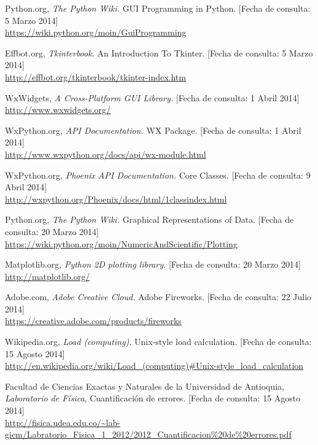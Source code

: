 \begin{thebibliography}{99}
	Python.org,
	\emph{The Python Wiki.}
	GUI Programming in Python. [Fecha de consulta: 5 Marzo 2014] \\
	\url{https://wiki.python.org/moin/GuiProgramming}
	
	Effbot.org,
	\emph{Tkinterbook.}
	An Introduction To Tkinter. [Fecha de consulta: 5 Marzo 2014] \\
	\url{http://effbot.org/tkinterbook/tkinter-index.htm}

	WxWidgets,
	\emph{A Cross-Platform GUI Library.} [Fecha de consulta: 1 Abril 2014] \\
	\url{http://www.wxwidgets.org/}

	WxPython.org,
	\emph{API Documentation.}
	WX Package. [Fecha de consulta: 1 Abril 2014] \\
	\url{http://www.wxpython.org/docs/api/wx-module.html}
	
	WxPython.org,
	\emph{Phoenix API Documentation.}
	Core Classes. [Fecha de consulta: 9 Abril 2014] \\
	\url{http://wxpython.org/Phoenix/docs/html/1classindex.html}
	
	Python.org,
	\emph{The Python Wiki.}
	Graphical Representations of Data. [Fecha de consulta: 20 Marzo 2014] \\
	\url{https://wiki.python.org/moin/NumericAndScientific/Plotting}
	
	Matplotlib.org,
	\emph{Python 2D plotting library.} [Fecha de consulta: 20 Marzo 2014] \\
	\url{http://matplotlib.org/}
	
	Adobe.com,
	\emph{Adobe Creative Cloud.} Adobe Fireworks. [Fecha de consulta: 22 Julio 2014] \\
	\url{https://creative.adobe.com/products/fireworks}
	
	Wikipedia.org,
	\emph{Load (computing).} Unix-style load calculation. [Fecha de consulta: 15 Agosto 2014] \\
	\url{http://en.wikipedia.org/wiki/Load_(computing)#Unix-style_load_calculation}
	
	Facultad de Ciencias Exactas y Naturales de la Universidad de Antioquia,
	\emph{Laboratorio de Física}, Cuantificación de errores. [Fecha de consulta: 15 Agosto 2014] \\
	\url{http://fisica.udea.edu.co/~lab-gicm/Labratorio_Fisica_1_2012/2012_Cuantificacion\%20de\%20errores.pdf}
\end{thebibliography}




